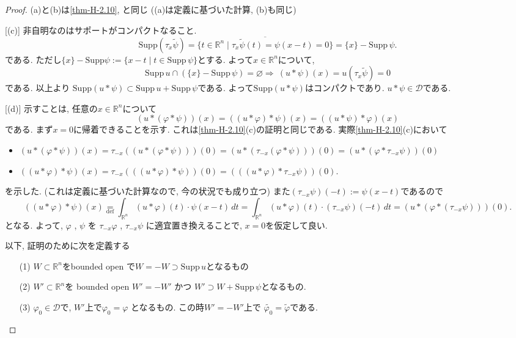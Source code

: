 \documentclass[dvipdfmx,a4paper,11pt]{article} %
\theoremstyle{definition}
\theoremstyle{remark}
\numberwithin{equation}{section}
\newcommand{\R}{\mathbb{R}}
\begin{document}
\begin{proof}

(a)と(b)は\ref{thm-H-2.10}, \cite[Theorem 6.30]{Rud}と同じ
((a)は定義に基づいた計算, (b)も同じ)

[(c)]
非自明なのはサポートがコンパクトなること.
 \[
 \mathrm{Supp}(\tau_x \widetilde{\psi}) 
 = \overline{ \{ t \in \R^n \mid \tau_x \widetilde{\psi}(t)=\psi(x-t)=0\}} =
 \{x\} - \mathrm{Supp}\, \psi.
 \]
である. 
ただし$ \{x\} - \mathrm{Supp}\psi:= \{ x - t \mid t\in \mathrm{Supp}\,\psi\}$とする. 
よって$x \in \R^n$について,
\[
 \mathrm{Supp}\, u \cap ( \{x\} - \mathrm{Supp}\, \psi) = \varnothing
 \Rightarrow 
\ (u \ast  \psi)(x) = u(\tau_x \widetilde{\psi}) = 0 
\]
である. 以上より
\( \mathrm{Supp}(u \ast  \psi) \subset \mathrm{Supp}\, u + \mathrm{Supp}\, \psi \)である.
よって$\mathrm{Supp}(u \ast  \psi) $はコンパクトであり. \( u \ast \psi \in \mathcal{D}\)である. 

[(d)]
示すことは, 任意の$x \in \R^n$について
\[(u \ast (\varphi \ast \psi))(x) = ((u \ast \varphi) \ast \psi )(x) = ((u \ast \psi) \ast \varphi)(x) \]
である. 
まず$x=0$に帰着できることを示す. 
これは\ref{thm-H-2.10}(c)の証明と同じである. 
実際\ref{thm-H-2.10}(c)において
\begin{itemize}
\item \((u \ast (\varphi \ast \psi))(x) 
= \tau_{-x}((u \ast (\varphi \ast \psi)))(0) 
= (u \ast (\tau_{-x}(\varphi \ast \psi)))(0)
= (u \ast (\varphi\ast \tau_{-x}\psi))(0) \)
\item \( ((u \ast \varphi) \ast \psi)(x) = \tau_{-x}(((u \ast \varphi) \ast \psi))(0) 
= (((u \ast \varphi) \ast \tau_{-x}\psi))(0).\)
\end{itemize}
を示した. (これは定義に基づいた計算なので, 今の状況でも成り立つ)
また$(\tau_{-x} \psi)(-t):=\psi(x - t)$であるので
\[
((u \ast \varphi) \ast \psi)(x)
\underset{\text{def}}{=} \int_{\mathbb{R}^n} (u \ast \varphi)(t) \cdot \psi(x - t)\, dt
= \int_{\mathbb{R}^n} (u \ast \varphi)(t)\cdot  (\tau_{-x} \psi)(-t)\, dt
= (u \ast (\varphi \ast (\tau_{-x} \psi)))(0).
\]
となる.
よって, \(\varphi\) , \(\psi\) を \(\tau_{-x} \varphi\) , \(\tau_{-x} \psi\) に適宜置き換えることで, 
 \(x = 0\)を仮定して良い.
 
以下, 証明のために次を定義する
\begin{itemize}
\item[(1)]  \(W \subset \mathbb{R}^n\)をbounded open で\(W = -W \supset \mathrm{Supp}\, u\)となるもの
\item[(2)]  \(W' \subset \mathbb{R}^n\)を bounded open \(W' = -W'\) かつ \(W' \supset W + \mathrm{Supp}\, \psi\)となるもの.
\item[(3)] \(\varphi_0 \in \mathcal{D}\)で,  \(W'\)上で\(\varphi_0 = \varphi\) となるもの. この時$W' = -W'$上で \(\widetilde{\varphi_0} = \widetilde{\varphi}\)である. 
\end{itemize}


\end{proof}
\end{document}
